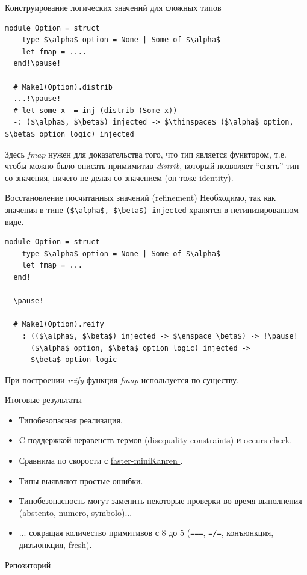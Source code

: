 \documentclass[10pt, mathserif]{beamer}
\theoremstyle{definition}
\begin{document}
\begin{frame}[fragile]{Конструирование логических значений для сложных типов}
  \begin{lstlisting}[mathescape=true]
  module Option = struct
    type $\alpha$ option = None | Some of $\alpha$
    let fmap = ....
  end!\pause!

  # Make1(Option).distrib
  ...!\pause!
  # let some x  = inj (distrib (Some x))
  -: ($\alpha$, $\beta$) injected -> $\thinspace$ ($\alpha$ option, $\beta$ option logic) injected
  \end{lstlisting}
  \pause

  Здесь \emph{fmap} нужен для доказательства того, что тип является функтором, т.е.
  чтобы можно было описать примимитив \emph{distrib}, который позволяет ``снять'' 
  тип со значения, ничего не делая со значением (он тоже identity).

\end{frame}

\begin{frame}[fragile]{Восстановление посчитанных значений (refinement)}
  Необходимо, так как значения в типе \lstinline[mathescape=true]{($\alpha$, $\beta$) injected} хранятся в
  нетипизированном виде.

  \begin{lstlisting}[mathescape=true]
  module Option = struct
    type $\alpha$ option = None | Some of $\alpha$
    let fmap = ...
  end!

  \pause!

  # Make1(Option).reify
    : (($\alpha$, $\beta$) injected -> $\enspace \beta$) -> !\pause!
      ($\alpha$ option, $\beta$ option logic) injected -> 
      $\beta$ option logic

  \end{lstlisting}

  При построении \emph{reify} функция \emph{fmap} используется по существу.
\end{frame}

\begin{frame}[fragile]{Итоговые результаты}

\begin{itemize}
 \item Типобезопасная реализация.
 \item C поддержкой неравенств термов (disequality constraints) и occurs check.
 \item Сравнима по скорости с \href{https://github.com/michaelballantyne/faster-miniKanren/}{faster-miniKanren \faGithub}.
 \item Типы выявляют простые ошибки.
 \item Типобезопасность могут заменить некоторые проверки во время выполнения (abstento, numero, symbolo)...
 \item ... сокращая количество примитивов с 8 до 5 
 (\lstinline{===}, \lstinline{=/=}, конъюнкция, дизъюнкция, fresh).
\end{itemize}

\vskip 2cm
Репозиторий \href{https://github.com/dboulytchev/OCanren}{\faGithub}
\end{frame}
\end{document}
